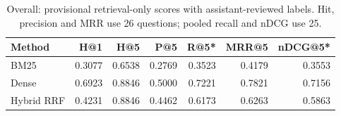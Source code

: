 \begin{table}[htbp]\centering\small
\caption{Overall: provisional retrieval-only scores with assistant-reviewed labels. Hit, precision and MRR use 26 questions; pooled recall and nDCG use 25.}\label{tab:retrieval-overall}
\begin{tabularx}{\linewidth}{Xrrrrrr}\toprule
Method & H@1 & H@5 & P@5 & R@5* & MRR@5 & nDCG@5*\\\midrule
BM25 & 0.3077 & 0.6538 & 0.2769 & 0.3523 & 0.4179 & 0.3553\\
Dense & 0.6923 & 0.8846 & 0.5000 & 0.7221 & 0.7821 & 0.7156\\
Hybrid RRF & 0.4231 & 0.8846 & 0.4462 & 0.6173 & 0.6263 & 0.5863\\
\bottomrule\end{tabularx}\end{table}
